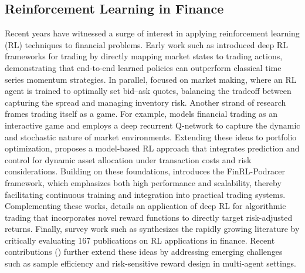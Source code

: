 \subsection{Reinforcement Learning in Finance}
Recent years have witnessed a surge of interest in applying reinforcement learning (RL) techniques to financial problems. Early work such as \cite{zhang2019deep} introduced deep RL frameworks for trading by directly mapping market states to trading actions, demonstrating that end‐to‐end learned policies can outperform classical time series momentum strategies. In parallel, \cite{selser2021optimal} focused on market making, where an RL agent is trained to optimally set bid–ask quotes, balancing the tradeoff between capturing the spread and managing inventory risk. Another strand of research frames trading itself as a game. For example, \cite{huang2018financial} models financial trading as an interactive game and employs a deep recurrent Q-network to capture the dynamic and stochastic nature of market environments. Extending these ideas to portfolio optimization, \cite{yu2019model} proposes a model‐based RL approach that integrates prediction and control for dynamic asset allocation under transaction costs and risk considerations. Building on these foundations, \cite{li2021finrl} introduces the FinRL-Podracer framework, which emphasizes both high performance and scalability, thereby facilitating continuous training and integration into practical trading systems. Complementing these works, \cite{theate2020application} details an application of deep RL for algorithmic trading that incorporates novel reward functions to directly target risk-adjusted returns. Finally, survey work such as \cite{pippas2024evolution} synthesizes the rapidly growing literature by critically evaluating 167 publications on RL applications in finance. Recent contributions (\cite{huang2022deepreinforcementlearningportfolio, hambly2023recent}) further extend these ideas by addressing emerging challenges such as sample efficiency and risk-sensitive reward design in multi-agent settings. 

